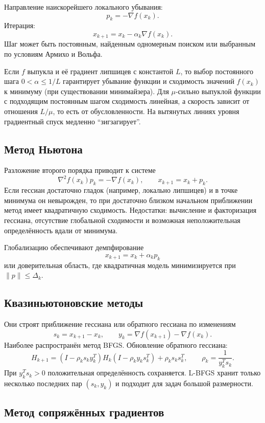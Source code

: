 Направление наискорейшего локального убывания:
\[
    p_k=-\nabla f(x_k).
\]
Итерация:
\[
    x_{k+1}=x_k-\alpha_k\nabla f(x_k).
\]
Шаг может быть постоянным, найденным одномерным поиском или выбранным по
условиям Армихо и Вольфа.

Если $f$ выпукла и её градиент липшицев с константой $L$, то выбор постоянного
шага $0<\alpha\le 1/L$ гарантирует убывание функции и сходимость значений
$f(x_k)$ к минимуму (при существовании минимайзера). Для $\mu$-сильно выпуклой
функции с подходящим постоянным шагом сходимость линейная, а скорость зависит от
отношения $L/\mu$, то есть от обусловленности.
На вытянутых линиях уровня градиентный спуск медленно ``зигзагирует''.

\subsection{Метод Ньютона}

Разложение второго порядка приводит к системе
\[
    \nabla^2 f(x_k)p_k=-\nabla f(x_k),
    \qquad
    x_{k+1}=x_k+p_k.
\]
Если гессиан достаточно гладок (например, локально липшицев) и в точке минимума
он невырожден, то при достаточно близком начальном приближении метод имеет
квадратичную сходимость. Недостатки:
вычисление и факторизация гессиана, отсутствие глобальной сходимости и возможная
неположительная определённость вдали от минимума.

Глобализацию обеспечивают демпфирование
\[
    x_{k+1}=x_k+\alpha_kp_k
\]
или доверительная область, где квадратичная модель минимизируется при
$\|p\|\leq\Delta_k$.

\subsection{Квазиньютоновские методы}

Они строят приближение гессиана или обратного гессиана по изменениям
\[
    s_k=x_{k+1}-x_k,
    \qquad
    y_k=\nabla f(x_{k+1})-\nabla f(x_k).
\]
Наиболее распространён метод BFGS. Обновление обратного гессиана:
\[
H_{k+1}=
(I-\rho_ks_ky_k^T)H_k(I-\rho_ky_ks_k^T)
+\rho_ks_ks_k^T,
\qquad
\rho_k=\frac1{y_k^Ts_k}.
\]
При $y_k^Ts_k>0$ положительная определённость сохраняется. L-BFGS хранит только
несколько последних пар $(s_k,y_k)$ и подходит для задач большой размерности.

\subsection{Метод сопряжённых градиентов}

